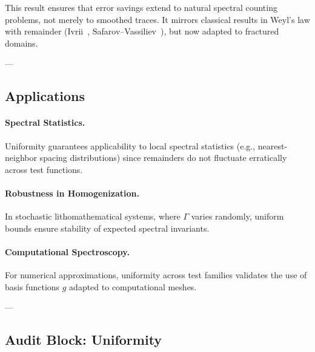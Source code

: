 \begin{remark}
This result ensures that error savings extend 
to natural spectral counting problems, 
not merely to smoothed traces.  
It mirrors classical results in Weyl’s law with remainder 
(Ivrii~\cite{Ivrii1980}, Safarov–Vassiliev~\cite{SafarovVassiliev1996}), 
but now adapted to fractured domains.
\end{remark}

---

\subsection{Applications}

\paragraph{Spectral Statistics.}  
Uniformity guarantees applicability to local spectral statistics 
(e.g., nearest-neighbor spacing distributions) 
since remainders do not fluctuate erratically across test functions.

\paragraph{Robustness in Homogenization.}  
In stochastic lithomathematical systems, 
where $\Gamma$ varies randomly,  
uniform bounds ensure stability of expected spectral invariants.

\paragraph{Computational Spectroscopy.}  
For numerical approximations, 
uniformity across test families validates 
the use of basis functions $g$ adapted to computational meshes.

---

\subsection{Audit Block: Uniformity}

